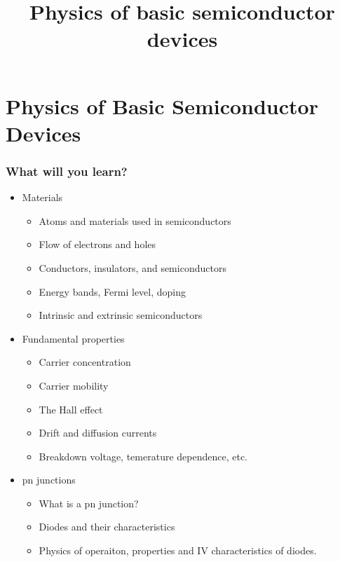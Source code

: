 \section{Physics of Basic Semiconductor Devices}
\title[Physics]{Physics of basic semiconductor devices}  

\begin{frame}[plain]
    \titlepage
\end{frame}

\begin{frame}
    \frametitle{What will you learn?}
\begin{itemize}
    \item Materials
        \begin{itemize}
            \item Atoms and materials used in semiconductors
            \item Flow of electrons and holes
            \item Conductors, insulators, and semiconductors
            \item Energy bands, Fermi level, doping
            \item Intrinsic and extrinsic semiconductors
        \end{itemize}
    \item Fundamental properties
        \begin{itemize}
            \item Carrier concentration 
            \item Carrier mobility
            \item The Hall effect
            \item Drift and diffusion currents
            \item Breakdown voltage, temerature dependence, etc.
        \end{itemize}
    \item pn junctions
        \begin{itemize}
            \item What is a pn junction?
            \item Diodes and their characteristics
            \item Physics of operaiton, properties and IV characteristics of diodes.
        \end{itemize}
\end{itemize}
\end{frame}

